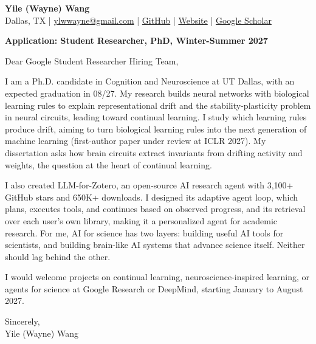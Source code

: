 \documentclass[11pt,letterpaper]{article}
\newcommand{\Position}{Student Researcher, PhD, Winter-Summer 2027}
\newcommand{\Team}{Google Student Researcher Hiring Team}
\begin{document}
\begin{center}
  {\Large\bfseries Yile (Wayne) Wang}\\[4pt]
  Dallas, TX \enspace | \enspace
  \href{mailto:ylwwayne@gmail.com}{ylwwayne@gmail.com} \enspace | \enspace
  \href{https://github.com/yilewang}{GitHub} \enspace | \enspace
  \href{https://yilewang.github.io/}{Website} \enspace | \enspace
  \href{https://scholar.google.com/citations?user=bgnVj8wAAAAJ}{Google Scholar}
\end{center}
\vspace{2pt}
\textbf{Application: \Position}

Dear \Team,

I am a Ph.D. candidate in Cognition and Neuroscience at UT Dallas, with an expected graduation in 08/27. My research builds neural networks with biological learning rules to explain representational drift and the stability-plasticity problem in neural circuits, leading toward continual learning. I study which learning rules produce drift, aiming to turn biological learning rules into the next generation of machine learning (first-author paper under review at ICLR 2027).
My dissertation asks how brain circuits extract invariants from drifting activity and weights, the question at the heart of continual learning.

I also created LLM-for-Zotero, an open-source AI research agent with 3,100+ GitHub stars and 650K+ downloads. I designed its adaptive agent loop, which plans, executes tools, and continues based on observed progress, and its retrieval over each user's own library, making it a personalized agent for academic research. For me, AI for science has two layers: building useful AI tools for scientists, and building brain-like AI systems that advance science itself. Neither should lag behind the other.

I would welcome projects on continual learning, neuroscience-inspired learning, or agents for science at Google Research or DeepMind, starting January to August 2027.

Sincerely,\\[3pt]
Yile (Wayne) Wang
\end{document}
